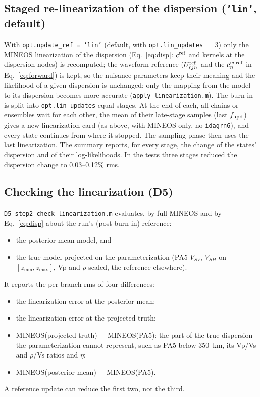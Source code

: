 \documentclass[11pt]{article}
\newcommand{\vsv}{V_{SV}}
\newcommand{\vsh}{V_{SH}}
\begin{document}
\subsection{Staged re-linearization of the dispersion (\texttt{'lin'}, default)}
With \texttt{opt.update\_ref = 'lin'} (default, with \texttt{opt.lin\_updates} $=3$) only the MINEOS linearization of the
dispersion (Eq.~\ref{eq:disp}: $c^{\rm ref}$ and kernels at the dispersion
nodes) is recomputed; the waveform reference ($U^{\rm ref}_{rjn}$ and the
$c^{w,\rm ref}_n$ in Eq.~\eqref{eq:forward}) is kept, so the nuisance
parameters keep their meaning and the likelihood of a given dispersion is
unchanged; only the mapping from the model to its dispersion becomes more
accurate (\texttt{apply\_linearization.m}). The burn-in is split into
\texttt{opt.lin\_updates} equal stages. At the end of each, all chains or
ensembles wait for each other, the mean of their late-stage samples (last
$f_{\rm upd}$) gives a new linearization card (as above, with MINEOS only,
no \texttt{idagrn6}), and every state continues from where it stopped.
The sampling phase then uses the last linearization. The summary reports,
for every stage, the change of the states' dispersion and of their
log-likelihoods. In the tests three stages reduced the dispersion change to
0.03--0.12\% rms.

\subsection{Checking the linearization (D5)}
\texttt{D5\_step2\_check\_linearization.m} evaluates, by full MINEOS and
by Eq.~\eqref{eq:disp} about the run's (post-burn-in) reference:
\begin{itemize}
\item the posterior mean model, and
\item the true model projected on the parameterization (PA5 $\vsv$,
  $\vsh$ on $[z_{\min},z_{\max}]$, Vp and $\rho$ scaled, the reference
  elsewhere).
\end{itemize}
It reports the per-branch rms of four differences:
\begin{itemize}
\item the linearization error at the posterior mean;
\item the linearization error at the projected truth;
\item MINEOS(projected truth) $-$ MINEOS(PA5): the part of the true
  dispersion the parameterization cannot represent, such as PA5 below
  350~km, its Vp/Vs and $\rho$/Vs ratios and $\eta$;
\item MINEOS(posterior mean) $-$ MINEOS(PA5).
\end{itemize}
A reference update can reduce the first two, not the third.
\end{document}
